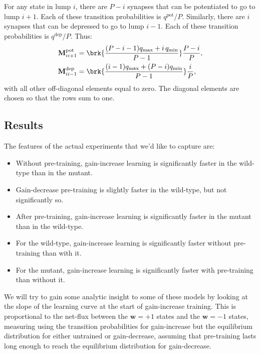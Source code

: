 \documentclass[12pt]{article}
\newcommand{\w}{\mathbf{w}}
\newcommand{\M}{\mathbf{M}}
\newcommand{\pot}{^{\text{pot}}}
\newcommand{\dep}{^{\text{dep}}}
\newcommand{\lmax}{_{\text{max}}}
\newcommand{\lmin}{_{\text{min}}}
\begin{document}
For any state in lump $i$, there are $P-i$ synapses that can be potentiated to go to lump $i+1$.
Each of these transition probabilities is $q\pot/P$.
Similarly, there are $i$ synapses that can be depressed to go to lump $i-1$.
Each of these transition probabilities is $q\dep/P$.
Thus:
%
\begin{equation}\label{eq:pooledpotdep}
  \begin{aligned}
    \M\pot_{ii+1} &=  \brk{\frac{(P-i-1)q\lmax + i\,q\lmin}{P-1}} \frac{P-i}{P}, \\
    \M\dep_{ii-1} &=  \brk{\frac{(i-1)q\lmax + (P-i)q\lmin}{P-1}} \frac{i}{P},
  \end{aligned}
\end{equation}
%
with all other off-diagonal elements equal to zero.
The diagonal elements are chosen so that the rows sum to one.


\subsection{Results}\label{sec:results}

The features of the actual experiments that we'd like to capture are:
\begin{itemize}
  \item Without pre-training, gain-increase learning is significantly faster in the wild-type than in the mutant.
  \item Gain-decrease pre-training is slightly faster in the wild-type, but not significantly so.
  \item After pre-training, gain-increase learning is significantly faster in the mutant than in the wild-type.
  \item For the wild-type, gain-increase learning is significantly faster without pre-training than with it.
  \item For the mutant, gain-increase learning is significantly faster with pre-training than without it.
\end{itemize}

We will try to gain some analytic insight to some of these models by looking at the slope of the learning curve at the start of gain-increase training.
This is proportional to the net-flux between the $\w=+1$ states and the $\w=-1$ states, measuring using the transition probabilities for gain-increase but the equilibrium distribution for either untrained or gain-decrease, assuming that pre-training lasts long enough to reach the equilibrium distribution for gain-decrease.
\end{document}
